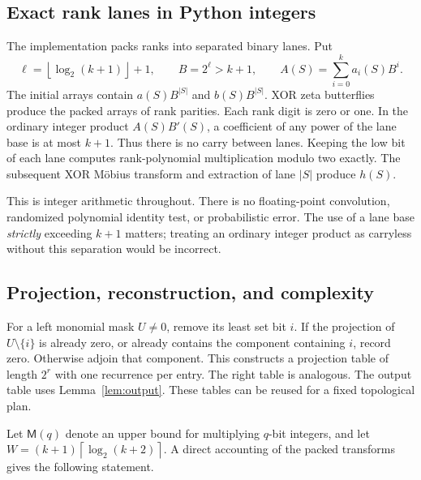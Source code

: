 \documentclass[11pt,letterpaper]{article}
\theoremstyle{definition}
\theoremstyle{remark}
\newcommand{\ceil}[1]{\left\lceil #1\right\rceil}
\newcommand{\floor}[1]{\left\lfloor #1\right\rfloor}
\begin{document}
\subsection{Exact rank lanes in Python integers}
The implementation packs ranks into separated binary lanes. Put
\[
 \ell=\floor{\log_2(k+1)}+1,
 \qquad B=2^\ell>k+1,
 \qquad A(S)=\sum_{i=0}^k a_i(S) B^i.
\]
The initial arrays contain $a(S)B^{|S|}$ and $b(S)B^{|S|}$. XOR zeta
butterflies produce the packed arrays of rank parities. Each rank digit
is zero or one. In the ordinary integer product $A(S)B'(S)$, a coefficient
of any power of the lane base is at most $k+1$. Thus there is no carry
between lanes. Keeping the low bit of each lane computes rank-polynomial
multiplication modulo two exactly. The subsequent XOR M\"obius transform
and extraction of lane $|S|$ produce $h(S)$.

This is integer arithmetic throughout. There is no floating-point
convolution, randomized polynomial identity test, or probabilistic error.
The use of a lane base \emph{strictly} exceeding $k+1$ matters; treating an
ordinary integer product as carryless without this separation would be
incorrect.

\subsection{Projection, reconstruction, and complexity}
For a left monomial mask $U\ne0$, remove its least set bit $i$. If the
projection of $U\setminus\{i\}$ is already zero, or already contains the
component containing $i$, record zero. Otherwise adjoin that component.
This constructs a projection table of length $2^r$ with one recurrence per
entry. The right table is analogous. The output table uses
Lemma~\ref{lem:output}. These tables can be reused for a fixed topological
plan.

Let $\mathsf M(q)$ denote an upper bound for multiplying $q$-bit integers,
and let $W=(k+1)\ceil{\log_2(k+2)}$. A direct accounting of the packed
transforms gives the following statement.
\end{document}
